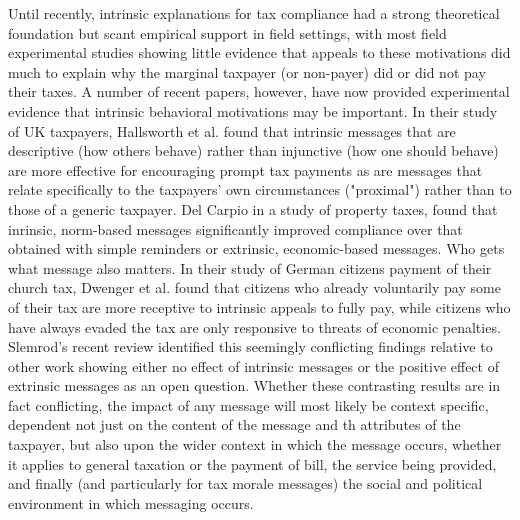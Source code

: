 \documentclass[12pt]{article}
\begin{document}
Until recently, intrinsic
explanations for tax compliance had a strong theoretical foundation
but scant empirical support in field settings, with most field
experimental studies showing little evidence that appeals to these
motivations did much to explain why the marginal taxpayer (or
non-payer) did or did not pay their taxes. A number of
recent papers, however, have now provided experimental
evidence that intrinsic behavioral motivations may be important.
In their study of UK taxpayers, Hallsworth et al. \citeyear{Hallsworth-17} found that
intrinsic messages that are descriptive (how others behave) rather than injunctive (how one should behave) are more effective for encouraging prompt tax payments as are messages that
relate specifically to the taxpayers' own circumstances ("proximal") rather than to those of a generic taxpayer. Del Carpio \citeyear{delcarpio} in a
study of property taxes, found that inrinsic, norm-based messages significantly improved compliance over that obtained with simple reminders or extrinsic, economic-based messages. Who gets what message also matters. In their study of German citizens payment of their church tax, Dwenger et al. \citeyear{dwenger_2017} found that citizens who already voluntarily pay some of their tax are more receptive to intrinsic appeals to fully pay, while citizens who have always evaded the tax are only responsive to threats of economic penalties. Slemrod's
\citeyear{slemrod2017} recent review identified this seemingly conflicting findings
relative to other work \cite{Blumenthal-01,torgler2004moral,Fellner-13,bergolo2017tax,castro} showing either no effect of intrinsic messages
or the positive effect of extrinsic messages as an open question. Whether these contrasting results are in fact conflicting, the impact of any message will most likely be context specific, dependent not just on the content of the message and th attributes of the taxpayer, but also upon the wider context in which the message occurs, whether it applies to general taxation or the payment of bill, the service being provided, and finally (and particularly for tax morale messages) the social and political environment in which messaging occurs.
\end{document}
